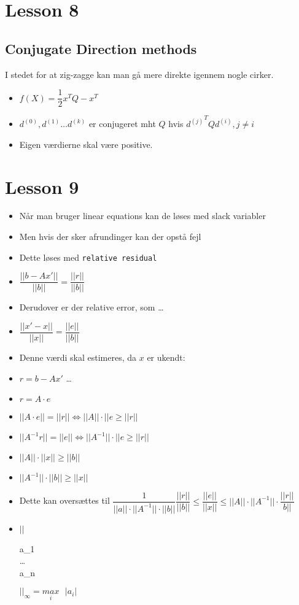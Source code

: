 \documentclass[danish, 10pt]{Memoir}
\begin{document}
\newpage
\section*{Lesson 8}	

\subsection*{Conjugate Direction methods}

I stedet for at zig-zagge kan man gå mere direkte igennem nogle cirker.

\begin{itemize}
	\item $f(X) = \dfrac{1}{2} x^T Q-x^T$
	\item $d^{(0)}, d^{(1)} \ldots d^{(k)}$ er conjugeret mht $Q$ hvis ${d^{(j)}}^T Q d^{(i)}, j \not = i$
	\item Eigen værdierne skal være positive.
\end{itemize}






\newpage
\section*{Lesson 9}

\begin{itemize}
	\item Når man bruger linear equations kan de løses med slack variabler
	\item Men hvis der sker afrundinger kan der opstå fejl
	\item Dette løses med \texttt{relative residual}
	\item[] $\dfrac{||b - Ax'||}{||b||} = \dfrac{||r||}{||b||}$
	\item Derudover er der relative error, som \dots
	\item[] $\dfrac{||x' - x||}{||x||} = \dfrac{||e||}{||b||}$
	\item Denne værdi skal estimeres, da $x$ er ukendt:
	\item[] $r = b-Ax'$ \dots
	\item[] $r = A \cdot e$
	\item[] $||A \cdot e|| = ||r|| \Leftrightarrow ||A|| \cdot ||e \geq ||r||$
	\item[] $||A^{-1} r|| = ||e|| \Leftrightarrow ||A^{-1}|| \cdot ||e \geq ||r||$
	\item[] $||A|| \cdot ||x|| \geq ||b||$
	\item[] $||A^{-1}|| \cdot ||b|| \geq ||x||$
	\item Dette kan oversættes til $\dfrac{1}{||a|| \cdot ||A^{-1}|| \cdot ||b||} \dfrac{||r||}{||b||} \leq \dfrac{||e||}{||x||} \leq ||A|| \cdot ||A^{-1}|| \cdot \dfrac{||r||}{b||}$
	\item[] 
	$||$\begin{ArgMat}
	a_1 \\ \dots \\ a_n
	\end{ArgMat}$||_\infty = \underset{i}{max}\text{ }|a_i|$
\end{itemize}
\end{document}
